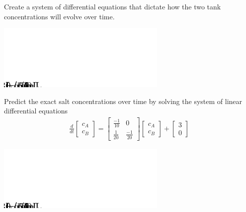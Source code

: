 \newpage
\begin{minipage}[h]{0.5\linewidth}
\vspace{0pt}
\begin{problem}
Create a system of differential equations that dictate 
how the two tank concentrations will evolve over time.
\end{problem}
\end{minipage} \hfill
\begin{minipage}[h]{0.45\linewidth}
\vspace{0pt}
\includegraphics[width=1.0\linewidth]{graphics/notes_09_tanks1}
\end{minipage}


\newpage
{}
\begin{minipage}[h]{0.5\linewidth}
\vspace{0pt}
\begin{problem}
  Predict the exact salt concentrations over time by 
  solving the system of linear differential equations
  \begin{align*}
\frac{d}{dt}    
\begin{bmatrix} c_A \\ c_B 
    \end{bmatrix}
=
\begin{bmatrix}
  \frac{-1}{10} & 0 \\
  \frac{1}{20} &   \frac{-1}{20}   
\end{bmatrix}
\begin{bmatrix} c_A \\ c_B 
    \end{bmatrix}
+ 
\begin{bmatrix}
  3 \\ 0 
\end{bmatrix}
  \end{align*}
\end{problem}
\end{minipage} \hfill
\begin{minipage}[h]{0.45\linewidth}
\vspace{0pt}
\includegraphics[width=1.0\linewidth]{graphics/notes_09_tanks1}
\end{minipage}

